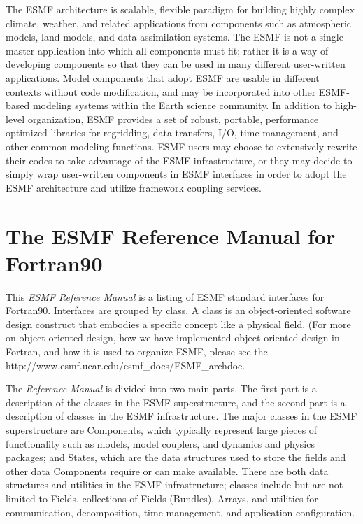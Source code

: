 The ESMF architecture is scalable, flexible paradigm for building highly 
complex climate, weather, and related applications from components such
as atmospheric models, land models, and data assimilation systems.  The 
ESMF is not a single master application into which all components must fit; 
rather it is a way of developing components so that they can be used 
in many different user-written applications.  Model components that adopt 
ESMF are usable in different contexts without code modification, and may be
incorporated into other ESMF-based modeling systems within the Earth 
science community.  In addition to high-level organization, ESMF provides 
a set of robust, portable, performance optimized libraries for regridding, 
data transfers, I/O, time management, and other common modeling functions.  
ESMF users may choose to extensively rewrite their codes to take advantage 
of the ESMF infrastructure, or they may decide to simply wrap user-written 
components in ESMF interfaces in order to adopt the ESMF architecture and 
utilize framework coupling services.

\section{The ESMF Reference Manual for Fortran90}

This {\it ESMF Reference Manual} is a listing of ESMF standard interfaces
for Fortran90.  Interfaces are grouped by class.  A class is an 
object-oriented software design construct that embodies a specific 
concept like a physical field.  (For more on object-oriented
design, how we have implemented object-oriented design in Fortran, and 
how it is used to organize 
ESMF, please see the 
{http://www.esmf.ucar.edu/esmf_docs/ESMF_archdoc}.

The {\it Reference Manual} is divided into two main parts.  The 
first part is a description 
of the classes in the ESMF superstructure, and the second part is a 
description of classes in the ESMF infrastructure.  The major classes
in the ESMF superstructure are Components, which typically represent
large pieces of functionality such as models, model couplers, and 
dynamics and physics packages; and States, which are the data structures
used to store the fields and other data Components require or can 
make available.  There are both data structures and utilities in the ESMF 
infrastructure; classes include but are not limited to Fields, 
collections of Fields (Bundles), Arrays, and utilities for communication,
decomposition, time management, and application configuration.

